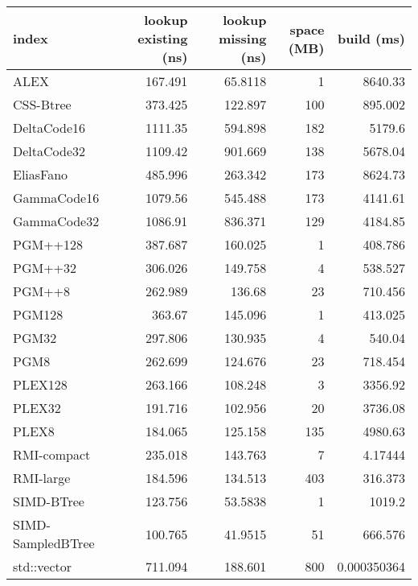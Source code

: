 \begin{tabular}{lrrrr}
\hline
 index             &   lookup existing (ns) &   lookup missing (ns) &   space (MB) &     build (ms) \\
\hline
 ALEX              &                167.491 &               65.8118 &            1 & 8640.33        \\
 CSS-Btree         &                373.425 &              122.897  &          100 &  895.002       \\
 DeltaCode16       &               1111.35  &              594.898  &          182 & 5179.6         \\
 DeltaCode32       &               1109.42  &              901.669  &          138 & 5678.04        \\
 EliasFano         &                485.996 &              263.342  &          173 & 8624.73        \\
 GammaCode16       &               1079.56  &              545.488  &          173 & 4141.61        \\
 GammaCode32       &               1086.91  &              836.371  &          129 & 4184.85        \\
 PGM++128          &                387.687 &              160.025  &            1 &  408.786       \\
 PGM++32           &                306.026 &              149.758  &            4 &  538.527       \\
 PGM++8            &                262.989 &              136.68   &           23 &  710.456       \\
 PGM128            &                363.67  &              145.096  &            1 &  413.025       \\
 PGM32             &                297.806 &              130.935  &            4 &  540.04        \\
 PGM8              &                262.699 &              124.676  &           23 &  718.454       \\
 PLEX128           &                263.166 &              108.248  &            3 & 3356.92        \\
 PLEX32            &                191.716 &              102.956  &           20 & 3736.08        \\
 PLEX8             &                184.065 &              125.158  &          135 & 4980.63        \\
 RMI-compact       &                235.018 &              143.763  &            7 &    4.17444     \\
 RMI-large         &                184.596 &              134.513  &          403 &  316.373       \\
 SIMD-BTree        &                123.756 &               53.5838 &            1 & 1019.2         \\
 SIMD-SampledBTree &                100.765 &               41.9515 &           51 &  666.576       \\
 std::vector       &                711.094 &              188.601  &          800 &    0.000350364 \\
\hline
\end{tabular}